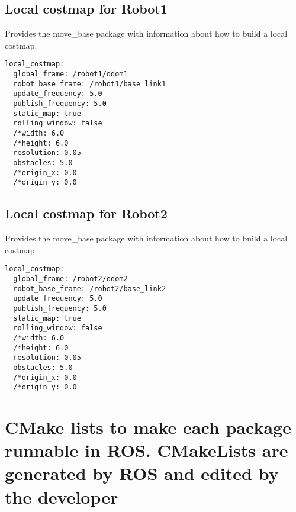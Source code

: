 \subsection{Local costmap for Robot1}
Provides the move\_base package with information about how to build a local costmap.
\begin{lstlisting}
local_costmap:
  global_frame: /robot1/odom1
  robot_base_frame: /robot1/base_link1
  update_frequency: 5.0
  publish_frequency: 5.0
  static_map: true
  rolling_window: false
  /*width: 6.0
  /*height: 6.0
  resolution: 0.05
  obstacles: 5.0
  /*origin_x: 0.0
  /*origin_y: 0.0
\end{lstlisting}

\subsection{Local costmap for Robot2}
Provides the move\_base package with information about how to build a local costmap.
\begin{lstlisting}
local_costmap:
  global_frame: /robot2/odom2
  robot_base_frame: /robot2/base_link2
  update_frequency: 5.0
  publish_frequency: 5.0
  static_map: true
  rolling_window: false
  /*width: 6.0
  /*height: 6.0
  resolution: 0.05
  obstacles: 5.0
  /*origin_x: 0.0
  /*origin_y: 0.0
\end{lstlisting}

\section{CMake lists to make each package runnable in ROS. CMakeLists are generated by ROS and edited by the developer}
